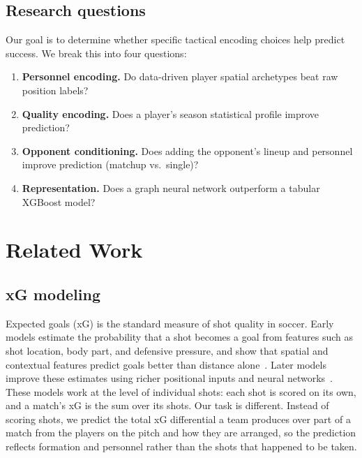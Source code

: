 \documentclass[11pt,twocolumn]{article}
\begin{document}
\subsection{Research questions}
Our goal is to determine whether specific tactical encoding choices help
predict success. We break this into four questions:

\begin{enumerate}
  \item \textbf{Personnel encoding.} Do data-driven player spatial
        archetypes beat raw position labels?
  \item \textbf{Quality encoding.} Does a player's season statistical
        profile improve prediction?
  \item \textbf{Opponent conditioning.} Does adding the opponent's
        lineup and personnel improve prediction (matchup vs.\ single)?
  \item \textbf{Representation.} Does a graph neural network outperform a
        tabular XGBoost model?
\end{enumerate}

\section{Related Work}

\subsection{xG modeling}
Expected goals (xG) is the standard measure of shot quality in soccer.
Early models estimate the probability that a shot becomes a goal from
features such as shot location, body part, and defensive pressure, and
show that spatial and contextual features predict goals better than
distance alone~\citep{lucey2015}. Later models improve these estimates
using richer positional inputs and neural networks~\citep{anzer2021}.
These models work at the level of individual shots: each shot is scored
on its own, and a match's xG is the sum over its shots. Our task is
different. Instead of scoring shots, we predict the total xG differential
a team produces over part of a match from the players on the pitch and
how they are arranged, so the prediction reflects formation and personnel
rather than the shots that happened to be taken.
\end{document}
